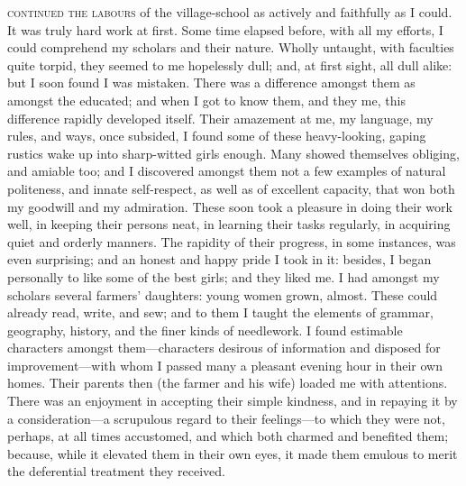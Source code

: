 
 \textsc{continued the labours} of the village-school as actively and faithfully
as I could. It was truly hard work at first. Some time elapsed before,
with all my efforts, I could comprehend my scholars and their nature.
Wholly untaught, with faculties quite torpid, they seemed to me
hopelessly dull; and, at first sight, all dull alike: but I soon found I
was mistaken. There was a difference amongst them as amongst the
educated; and when I got to know them, and they me, this difference
rapidly developed itself. Their amazement at me, my language, my rules,
and ways, once subsided, I found some of these heavy-looking, gaping
rustics wake up into sharp-witted girls enough. Many showed themselves
obliging, and amiable too; and I discovered amongst them not a few
examples of natural politeness, and innate self-respect, as well as of
excellent capacity, that won both my goodwill and my admiration. These
soon took a pleasure in doing their work well, in keeping their persons
neat, in learning their tasks regularly, in acquiring quiet and orderly
manners. The rapidity of their progress, in some instances, was even
surprising; and an honest and happy pride I took in it: besides, I began
personally to like some of the best girls; and they liked me. I had
amongst my scholars several farmers' daughters: young women grown,
almost. These could already read, write, and sew; and to them I taught
the elements of grammar, geography, history, and the finer kinds of
needlework. I found estimable characters amongst them---characters
desirous of information and disposed for improvement---with whom I
passed many a pleasant evening hour in their own homes. Their parents
then (the farmer and his wife) loaded me with attentions. There was an
enjoyment in accepting their simple kindness, and in repaying it by a
consideration---a scrupulous regard to their feelings---to which they
were not, perhaps, at all times accustomed, and which both charmed and
benefited them; because, while it elevated them in their own eyes, it
made them emulous to merit the deferential treatment they received.

